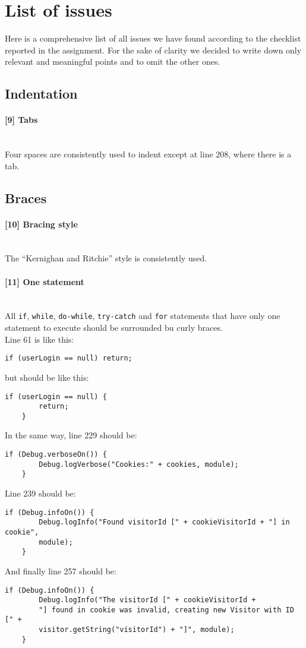 \pagebreak

\newcommand{\code}[1]{\texttt{#1}}
\newcommand{\issue}[2][?]{
    \paragraph{[#1] #2} \mbox{}\\ 
}

\section{List of issues}

Here is a comprehensive list of all issues we have found according to the
checklist reported in the assignment.
For the sake of clarity we decided to write down only relevant and 
meaningful points and to omit the other ones.

\subsection{Indentation}

\issue[9]{Tabs}
	Four spaces are consistently used to indent except at line 208, where there is a tab.

\subsection{Braces}

\issue[10]{Bracing style}
	The ``Kernighan and Ritchie'' style is consistently used.

\issue[11]{One statement}
	All \texttt{if}, \texttt{while}, \texttt{do-while}, \texttt{try-catch} and \texttt{for} statements that have only one statement to execute should be surrounded bu curly braces. \\
	Line 61 is like this:
	\begin{lstlisting}[basicstyle=\small\ttfamily,columns=fullflexible]
	if (userLogin == null) return;
	\end{lstlisting}
	but should be like this:
	\begin{lstlisting}[basicstyle=\small\ttfamily,columns=fullflexible]
	if (userLogin == null) {
		return;
	}
	\end{lstlisting}
	In the same way, line 229 should be:
	\begin{lstlisting}[basicstyle=\small\ttfamily,columns=fullflexible]
	if (Debug.verboseOn()) {
		Debug.logVerbose("Cookies:" + cookies, module);
	}
	\end{lstlisting}
	Line 239 should be:
	\begin{lstlisting}[basicstyle=\small\ttfamily,columns=fullflexible]
	if (Debug.infoOn()) {
		Debug.logInfo("Found visitorId [" + cookieVisitorId + "] in	cookie", 
		module);
	}
	\end{lstlisting}	
	And finally line 257 should be:
	\begin{lstlisting}[basicstyle=\small\ttfamily,columns=fullflexible]
	if (Debug.infoOn()) {
		Debug.logInfo("The visitorId [" + cookieVisitorId + 
		"] found in cookie was invalid, creating new Visitor with ID [" +
		visitor.getString("visitorId") + "]", module);
	}
	\end{lstlisting}

